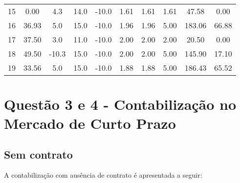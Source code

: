 \documentclass[a4paper,12pt,twoside]{article}
\begin{document}
\begin{center}
\begin{tabular}{ c c c c c c c c c c }
        15    & 0.00   & 4.3  & 14.0 & -10.0  & 1.61  & 1.61  & 1.61   & 47.58    & 0.00 \\
        16   & 36.93   & 5.0  & 15.0 & -10.0  & 1.96  & 1.96  & 5.00  & 183.06   & 66.88 \\
        17   & 37.50   & 3.0  & 11.0 & -10.0  & 2.00  & 2.00  & 2.00   & 20.50    & 0.00 \\
        18   & 49.50 & -10.3  & 15.0 & -10.0  & 2.00  & 2.00  & 5.00  & 145.90   & 17.10 \\
        19   & 33.56   & 5.0  & 15.0 & -10.0  & 1.88  & 1.88  & 5.00  & 186.43   & 65.52
    \end{tabular}
\end{center}


\newpage

\section{Questão 3 e 4 - Contabilização no Mercado de Curto Prazo}
\subsection{Sem contrato}
A contabilização com ausência de contrato é apresentada a seguir:
\end{document}
